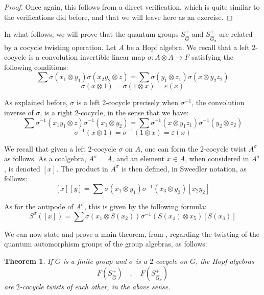 \documentclass[12pt]{amsbook}
\newtheorem{theorem}{Theorem}[chapter]
\begin{document}
\begin{proof}
Once again, this follows from a direct verification, which is quite similar to the verifications did before, and that we will leave here as an exercise.
\end{proof}


In what follows, we will prove that the quantum groups $S_{\widehat{G}}^+$ and $S_{\widehat{G}_\sigma}^+$ are related by a cocycle twisting operation. Let $A$ be a Hopf algebra. We recall that a left 2-cocycle is a convolution invertible linear map $\sigma:A\otimes A\to F$ satisfying the following conditions:
$$\sum\sigma(x_1\otimes y_1)\sigma(x_2y_2\otimes z)=\sum\sigma(y_1\otimes z_1)\sigma(x\otimes y_2z_2)$$ 
$$\sigma(x\otimes1)=\sigma(1\otimes x)=\varepsilon(x)$$

As explained before, $\sigma$ is a left 2-cocycle precisely when $\sigma^{-1}$, the convolution inverse of $\sigma$, is a right 2-cocycle, in the sense that we have:
$$\sum\sigma^{-1}(x_1y_1\otimes z)\sigma^{-1}(x_1\otimes y_2)=\sum\sigma^{-1}(x\otimes y_1z_1)\sigma^{-1}(y_2\otimes z_2)$$
$$\sigma^{-1}(x\otimes 1)=\sigma^{-1}(1\otimes x)=\varepsilon(x)$$

We recall that given a left 2-cocycle $\sigma$ on $A$, one can form the 2-cocycle twist $A^\sigma$ as follows. As a coalgebra, $A^\sigma=A$, and an element $x\in A$, when considered in $A^\sigma$, is denoted $[x]$. The product in $A^\sigma$ is then defined, in Sweedler notation, as follows: 
$$[x][y]=\sum\sigma(x_1\otimes y_1)\sigma^{-1}(x_3\otimes y_3)[x_2y_2]$$ 

As for the antipode of $A^\sigma$, this is given by the following formula:
$$S^{\sigma}([x])=\sum\sigma(x_1\otimes S(x_2))\sigma^{-1}(S(x_4)\otimes x_5)[S(x_3)]$$

We can now state and prove a main theorem, from \cite{bbs}, regarding the twisting of the quantum automorphism groups of the group algebras, as follows:

\begin{theorem}
If $G$ is a finite group and $\sigma$ is a $2$-cocycle on $G$, the Hopf algebras
$$F(S_{\widehat{G}}^+)\quad,\quad F(S_{\widehat{G}_\sigma}^+)$$
are $2$-cocycle twists of each other, in the above sense.
\end{theorem}
\end{document}
